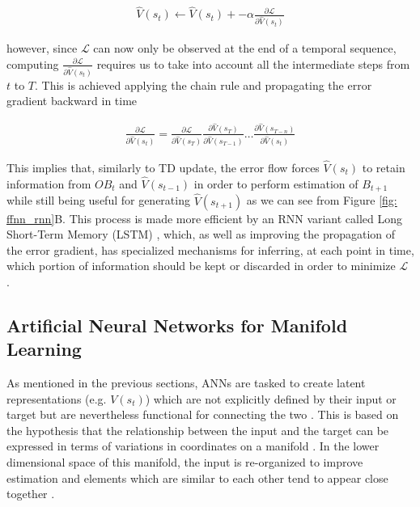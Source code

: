 \begin{gather}
\label{bptt_1}
    \widehat{V}(s_t) \leftarrow \widehat{V}(s_t) + -\alpha \frac{\partial \mathcal{L}}{\partial \widehat{V}(s_t)}
\end{gather}

however, since $\mathcal{L}$ can now only be observed at the end of a temporal sequence, computing $\frac{\partial \mathcal{L}}{\partial \widehat{V}(s_t)}$ requires us to take into account all the intermediate steps from $t$ to $T$. This is achieved applying the chain rule and propagating the error gradient backward in time \cite{bengio2017deep,lillicrap2019backpropagation}

\begin{gather}
\label{bptt_2}
    \frac{\partial \mathcal{L}}{\partial \widehat{V}(s_t)} = 
    \frac{\partial \mathcal{L}}{\partial \widehat{V}(s_{T})}
    \frac{\partial \widehat{V}(s_{T})}{\partial \widehat{V}(s_{T-1})}
    \dots
    \frac{\partial \widehat{V}(s_{T-n})}{\partial \widehat{V}(s_{t})}
\end{gather}

This implies that, similarly to TD update, the error flow forces $\widehat{V}(s_t)$ to retain information from $OB_t$ and $\widehat{V}(s_{t-1})$ in order to perform estimation of $B_{t+1}$ while still being useful for generating $\widehat{V}(s_{t+1})$ as we can see from Figure \ref{fig: ffnn_rnn}B. This process is made more efficient by an RNN variant called Long Short-Term Memory (LSTM) \cite{hochreiter1997long}, which, as well as improving the propagation of the error gradient, has specialized mechanisms for inferring, at each point in time, which portion of information should be kept or discarded in order to minimize $\mathcal{L}$ \cite{hochreiter1997long,bengio2017deep}.



\subsection{Artificial Neural Networks for Manifold Learning}
\label{manifold_learning}
As mentioned in the previous sections, ANNs are tasked to create latent representations (e.g. $V(s_{t})$) which are not explicitly defined by their input or target but are nevertheless functional for connecting the two \cite{rumelhart1986learning,bengio2017deep,lillicrap2020backpropagation}. This is based on the hypothesis that the relationship between the input and the target can be expressed in terms of variations in coordinates on a manifold \cite{bengio2017deep}. In the lower dimensional space of this manifold, the input is re-organized to improve estimation and elements which are similar to each other tend to appear close together \cite{bengio2017deep}. 

